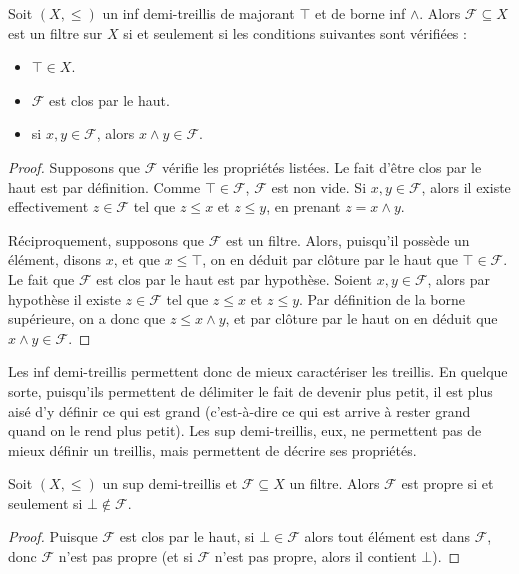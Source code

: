 \begin{property}
  Soit $(X,\leq)$ un inf demi-treillis de majorant $\top$ et de borne inf
  $\land$. Alors $\mathcal F\subseteq X$ est un filtre sur $X$ si et seulement
  si les conditions suivantes sont vérifiées :
  \begin{itemize}
  \item $\top \in X$.
  \item $\mathcal F$ est clos par le haut.
  \item si $x,y\in \mathcal F$, alors $x\land y\in \mathcal F$.
  \end{itemize}
\end{property}

\begin{proof}
  Supposons que $\mathcal F$ vérifie les propriétés listées. Le fait d'être
  clos par le haut est par définition. Comme $\top\in\mathcal F$,
  $\mathcal F$ est non vide. Si $x,y\in\mathcal F$, alors il existe
  effectivement $z\in \mathcal F$ tel que $z\leq x$ et $z\leq y$, en prenant
  $z = x\land y$.

  Réciproquement, supposons que $\mathcal F$ est un filtre. Alors, puisqu'il
  possède un élément, disons $x$, et que $x\leq \top$, on en déduit par clôture
  par le haut que $\top\in\mathcal F$. Le fait que $\mathcal F$ est clos par le
  haut est par hypothèse. Soient $x,y\in \mathcal F$, alors par hypothèse il
  existe $z\in \mathcal F$ tel que $z\leq x$ et $z\leq y$. Par définition de la
  borne supérieure, on a donc que $z\leq x\land y$, et par clôture par le haut
  on en déduit que $x\land y \in \mathcal F$.
\end{proof}

Les inf demi-treillis permettent donc de mieux caractériser les treillis. En
quelque sorte, puisqu'ils permettent de délimiter le fait de devenir plus petit,
il est plus aisé d'y définir ce qui est grand (c'est-à-dire ce qui est arrive à
rester grand quand on le rend plus petit). Les sup demi-treillis, eux, ne
permettent pas de mieux définir un treillis, mais permettent de décrire ses
propriétés.

\begin{property}
  Soit $(X,\leq)$ un sup demi-treillis et $\mathcal F \subseteq X$ un filtre.
  Alors $\mathcal F$ est propre si et seulement si $\bot\notin\mathcal F$.
\end{property}

\begin{proof}
  Puisque $\mathcal F$ est clos par le haut, si $\bot\in\mathcal F$ alors tout
  élément est dans $\mathcal F$, donc $\mathcal F$ n'est pas propre (et si
  $\mathcal F$ n'est pas propre, alors il contient $\bot$).
\end{proof}

